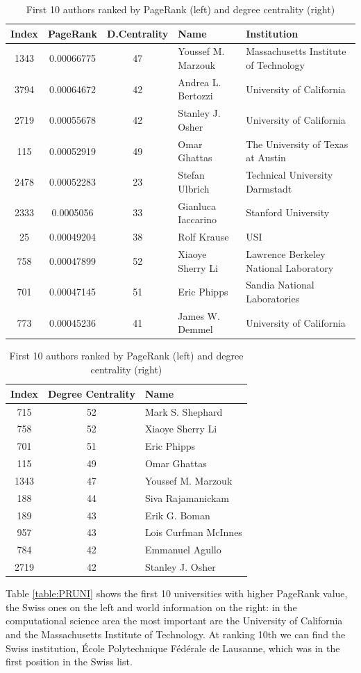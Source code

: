 \documentclass[]{usiinfbachelorproject}
\begin{document}
\newcommand\eee{\centering}
\begin{table}[tbh]
\centering
\tiny
\caption{First 10 authors ranked by PageRank (left) and degree centrality (right)}
\begin{tabular}{c c c l l}
\textbf{Index} & \textbf{PageRank} & \textbf{D.Centrality} & \textbf{Name} & \textbf{Institution}\\
\hline
1343 & 0.00066775 & 47 & Youssef M. Marzouk & Massachusetts Institute of Technology \\
3794 & 0.00064672 & 42 & Andrea L. Bertozzi & University of California \\
2719 & 0.00055678 & 42 & Stanley J. Osher & University of California \\
115 & 0.00052919 & 49 & Omar Ghattas & The University of Texas at Austin \\
2478 & 0.00052283 & 23 & Stefan Ulbrich & Technical University Darmstadt \\
2333 & 0.0005056 & 33 & Gianluca Iaccarino & Stanford University \\
25 & 0.00049204 & 38 & Rolf Krause & USI \\
758 & 0.00047899 & 52 & Xiaoye Sherry Li & Lawrence Berkeley National Laboratory \\
701 & 0.00047145 & 51 & Eric Phipps & Sandia National Laboratories \\
773 & 0.00045236 & 41 & James W. Demmel& University of California
\end{tabular}
\qquad\qquad
\begin{tabular}{c c l}
\textbf{Index} & \textbf{Degree Centrality} & \textbf{Name} \\
\hline
715& 52 & Mark S. Shephard \\
758 & 52 & Xiaoye Sherry Li \\
701 & 51 & Eric Phipps\\
115 &49 & Omar Ghattas \\
1343 & 47 & Youssef M. Marzouk\\
188 & 44 & Siva Rajamanickam\\
189 & 43 & Erik G. Boman\\
957 & 43 & Lois Curfman McInnes\\
784 & 42 & Emmanuel Agullo \\
2719 & 42 & Stanley J. Osher
\end{tabular}
\label{table:prW}
\end{table}

Table \ref{table:PRUNI} shows the first 10 universities with higher PageRank value, the Swiss ones on the left and world information on the right: in the computational science area the most important are the University of California and the Massachusetts Institute of Technology. At ranking 10th we can find the Swiss institution, \'{E}cole Polytechnique F\'{e}d\'{e}rale de Lausanne, which was in the first position in the Swiss list.
\end{document}
